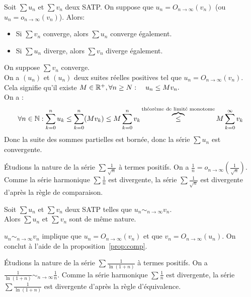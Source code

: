 \documentclass{book}
\begin{document}
\begin{Proposition} \label{prop:comp}
Soit $\sum u_n$ et $\sum v_n$ deux SATP.
On suppose que $u_n = O_{n\to \infty }(v_n)$ (ou  $u_n = o_{n\to \infty }(v_n)$).
Alors:
\begin{itemize}
\item
  Si $\sum v_n$ converge, alors $\sum u_n$ converge également.
\item
  Si $\sum u_n$ diverge, alors $\sum v_n$ diverge également.
\end{itemize}
\end{Proposition} 
\begin{Demonstration}
On suppose $\sum v_n$ converge.\\
On a  $(u_n)$ et $(u_n)$ deux suites réelles positives tel que $u_n = O_{n\to \infty }(v_n)$. Cela signifie qu'il existe 
$ M\in \mathbb{R}^+,\forall n\geq N :\quad  u_n\leq M v_n.$\\
On a :
$$\forall n \in \mathbb{N} :	\sum_{k=0}^n u_k\leq \sum_{k=0}^n(M v_k) \leq M\sum_{k=0}^n v_k\overbrace{\leq}^{\text{théorème de limité monotome}} M\sum_{k=0}^{\infty} v_k $$
Donc la suite des sommes partielles est bornée, donc la série $\sum u_n$ est convergente. 
\end{Demonstration}
\begin{Exemple}
Étudions la nature de la  série $\sum \frac{1}{\sqrt{n}}$ à termes positifs. On a  $\frac{1}{n}=o_{n\to \infty }(\frac{1}{\sqrt{n}})$. Comme la série harmonique $\sum \frac 1 n$ est divergente, la série $\sum \frac{1}{\sqrt{n}}$ est divergente d'après la règle de comparaison. 
\end{Exemple}
\begin{Proposition}
Soit $\sum u_n$ et $\sum v_n$ deux SATP telles que $u_n \sim_{n\to \infty } v_n$.\\
Alors $\sum u_n$ et $\sum v_n$ sont de même nature.
\end{Proposition}
\begin{Demonstration}
$u_n \sim_{n\to \infty } v_n$ implique que $u_n= O_{n\to \infty }(v_n)$ et que $v_n= O_{n\to \infty }(u_n)$. On conclut à l'aide de la proposition~\ref{prop:comp}.
\end{Demonstration}
\begin{Exemple}
Étudions la nature de la  série $\sum \frac{1}{\ln(1+n)}$ à termes positifs. On a  $\frac{1}{\ln(1+n)}\sim_{n\to \infty } \frac 1 n$. Comme la série harmonique $\sum \frac 1 n$ est divergente,   la série $\sum \frac{1}{\ln(1+n)}$ est divergente d'après la règle d'équivalence. 
\end{Exemple} 
\end{document}
